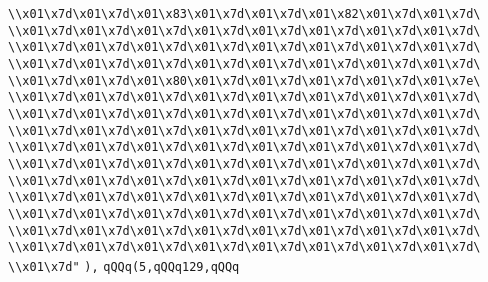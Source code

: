 \verb|\\x01\x7d\x01\x7d\x01\x83\x01\x7d\x01\x7d\x01\x82\x01\x7d\x01\x7d\|\newline
\verb|\\x01\x7d\x01\x7d\x01\x7d\x01\x7d\x01\x7d\x01\x7d\x01\x7d\x01\x7d\|\newline
\verb|\\x01\x7d\x01\x7d\x01\x7d\x01\x7d\x01\x7d\x01\x7d\x01\x7d\x01\x7d\|\newline
\verb|\\x01\x7d\x01\x7d\x01\x7d\x01\x7d\x01\x7d\x01\x7d\x01\x7d\x01\x7d\|\newline
\verb|\\x01\x7d\x01\x7d\x01\x80\x01\x7d\x01\x7d\x01\x7d\x01\x7d\x01\x7e\|\newline
\verb|\\x01\x7d\x01\x7d\x01\x7d\x01\x7d\x01\x7d\x01\x7d\x01\x7d\x01\x7d\|\newline
\verb|\\x01\x7d\x01\x7d\x01\x7d\x01\x7d\x01\x7d\x01\x7d\x01\x7d\x01\x7d\|\newline
\verb|\\x01\x7d\x01\x7d\x01\x7d\x01\x7d\x01\x7d\x01\x7d\x01\x7d\x01\x7d\|\newline
\verb|\\x01\x7d\x01\x7d\x01\x7d\x01\x7d\x01\x7d\x01\x7d\x01\x7d\x01\x7d\|\newline
\verb|\\x01\x7d\x01\x7d\x01\x7d\x01\x7d\x01\x7d\x01\x7d\x01\x7d\x01\x7d\|\newline
\verb|\\x01\x7d\x01\x7d\x01\x7d\x01\x7d\x01\x7d\x01\x7d\x01\x7d\x01\x7d\|\newline
\verb|\\x01\x7d\x01\x7d\x01\x7d\x01\x7d\x01\x7d\x01\x7d\x01\x7d\x01\x7d\|\newline
\verb|\\x01\x7d\x01\x7d\x01\x7d\x01\x7d\x01\x7d\x01\x7d\x01\x7d\x01\x7d\|\newline
\verb|\\x01\x7d\x01\x7d\x01\x7d\x01\x7d\x01\x7d\x01\x7d\x01\x7d\x01\x7d\|\newline
\verb|\\x01\x7d\x01\x7d\x01\x7d\x01\x7d\x01\x7d\x01\x7d\x01\x7d\x01\x7d\|\newline
\verb|\\x01\x7d"|\newline
\verb|),|\newline
\verb|qQQq(5,qQQq129,qQQq|\newline
